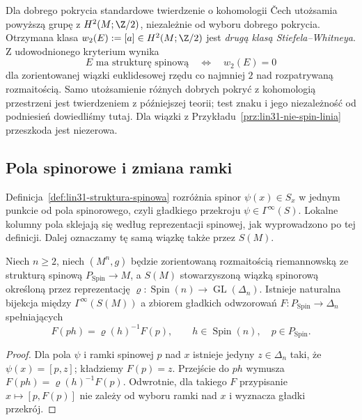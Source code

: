 \begin{uwaga}
Dla dobrego pokrycia standardowe twierdzenie
o kohomologii Čech utożsamia powyższą grupę
z $H^2(M;\Z/2)$, niezależnie od wyboru
dobrego pokrycia. Otrzymana klasa
$w_2(E):=[a]\in H^2(M;\Z/2)$
jest \emph{drugą klasą Stiefela--Whitneya}.
Z udowodnionego kryterium wynika
\[
 E\text{ ma strukturę spinową}
 \quad\Longleftrightarrow\quad w_2(E)=0
\]
dla zorientowanej wiązki euklidesowej
rzędu co najmniej $2$ nad rozpatrywaną
rozmaitością. Samo utożsamienie różnych
dobrych pokryć z kohomologią przestrzeni jest
twierdzeniem z późniejszej teorii; test znaku
i jego niezależność od podniesień dowiedliśmy tutaj.
Dla wiązki z
Przykładu~\ref{prz:lin31-nie-spin-linia}
przeszkoda jest niezerowa.
\end{uwaga}

\subsection{Pola spinorowe i zmiana ramki}
\label{sec:lin31-pola-spinorowe-podstawy}

Definicja~\ref{def:lin31-struktura-spinowa} rozróżnia spinor
$\psi(x)\in S_x$ w jednym punkcie od pola spinorowego,
czyli gładkiego przekroju $\psi\in\Gamma^\infty(S)$.
Lokalne kolumny pola sklejają się według reprezentacji
spinowej, jak wyprowadzono po tej definicji.
Dalej oznaczamy tę samą wiązkę także przez $S(M)$.
\begin{stwierdzenie}
\label{prop:lin31-pola-spinorowe-ekwiwariantnosc}
Niech $n\geq2$, niech $(M^n,g)$ będzie zorientowaną
rozmaitością riemannowską ze strukturą spinową
$P_{\mathrm{Spin}}\to M$, a $S(M)$ stowarzyszoną
wiązką spinorową określoną przez reprezentację
$\varrho:\operatorname{Spin}(n)\to\operatorname{GL}(\Delta_n)$.
Istnieje naturalna bijekcja między
$\Gamma^\infty(S(M))$ a zbiorem gładkich odwzorowań
$F:P_{\mathrm{Spin}}\to\Delta_n$ spełniających
\begin{equation}\label{eq:lin31-pola-spinorowe-ekwiwariantnosc}
 F(ph)=\varrho(h)^{-1}F(p),\qquad
 h\in\operatorname{Spin}(n),\quad p\in P_{\mathrm{Spin}}.
\end{equation}
\end{stwierdzenie}
\begin{proof}
Dla pola $\psi$ i ramki spinowej $p$ nad $x$ istnieje
jedyny $z\in\Delta_n$ taki, że $\psi(x)=[p,z]$;
kładziemy $F(p)=z$. Przejście do $ph$ wymusza
$F(ph)=\varrho(h)^{-1}F(p)$. Odwrotnie, dla takiego $F$
przypisanie $x\mapsto[p,F(p)]$ nie zależy od wyboru
ramki nad $x$ i wyznacza gładki przekrój.
\end{proof}


